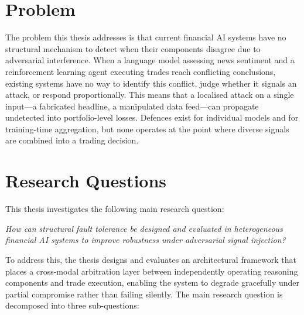 
\section{Problem}
The problem this thesis addresses is that current financial AI systems have no structural mechanism to detect when their components disagree due to adversarial interference. When a language model assessing news sentiment and a reinforcement learning agent executing trades reach conflicting conclusions, existing systems have no way to identify this conflict, judge whether it signals an attack, or respond proportionally. This means that a localised attack on a single input---a fabricated headline, a manipulated data feed---can propagate undetected into portfolio-level losses. Defences exist for individual models and for training-time aggregation, but none operates at the point where diverse signals are combined into a trading decision.


\section{Research Questions}

This thesis investigates the following main research question:

\emph{How can structural fault tolerance be designed and evaluated in
heterogeneous financial AI systems to improve robustness under adversarial
signal injection?}

To address this, the thesis designs and evaluates an architectural framework
that places a cross-modal arbitration layer between independently operating
reasoning components and trade execution, enabling the system to degrade
gracefully under partial compromise rather than failing silently. The main
research question is decomposed into three sub-questions:

